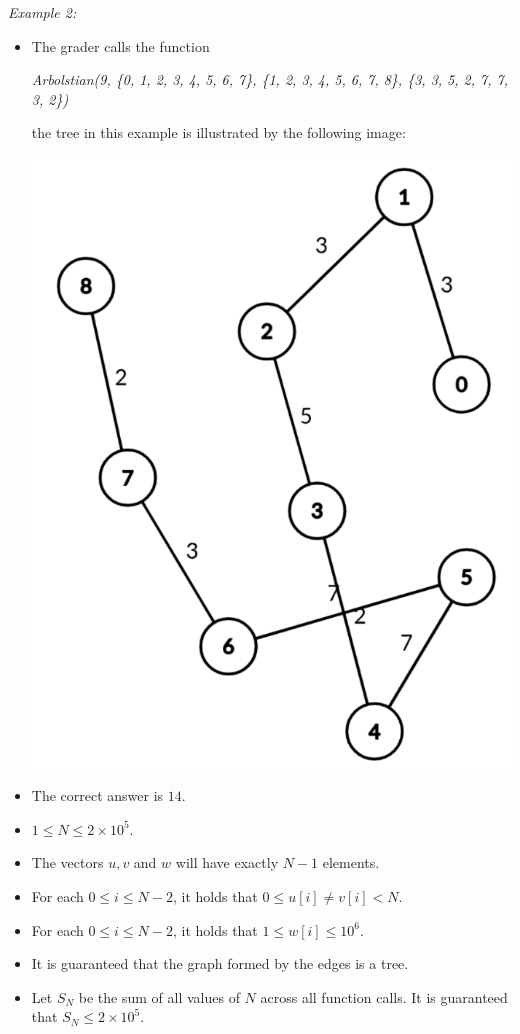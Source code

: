 \documentclass[12pt]{scrartcl}
\begin{document}
        {\itshape Example 2:}
        \begin{itemize}
            \item The grader calls the function 
            \begin{center}
                \textit{Arbolstian(9, \{0, 1, 2, 3, 4, 5, 6, 7\}, \{1, 2, 3, 4, 5, 6, 7, 8\}, \{3, 3, 5, 2, 7, 7, 3, 2\})}
            \end{center}
            the tree in this example is illustrated by the following image:
            \begin{center}
                \includegraphics[scale=0.25]{ej2.png}
            \end{center}
            \item The correct answer is $14$.
        \end{itemize}
        

        \begin{itemize}
            \item $1 \le N \le 2\times10^5$.
            \item The vectors $u, v$ and $w$ will have exactly $N - 1$ elements.
            \item For each $0 \le i \le N - 2$, it holds that $0 \le u[i] \neq v[i] < N$. 
            \item For each $0 \le i \le N - 2$, it holds that $1 \le w[i] \le 10^6$.
            \item It is guaranteed that the graph formed by the edges is a tree.
            \item Let $S_N$ be the sum of all values of $N$ across all function calls. It is guaranteed that $S_N \le 2\times 10^5$.
        \end{itemize}
    
\end{document}
